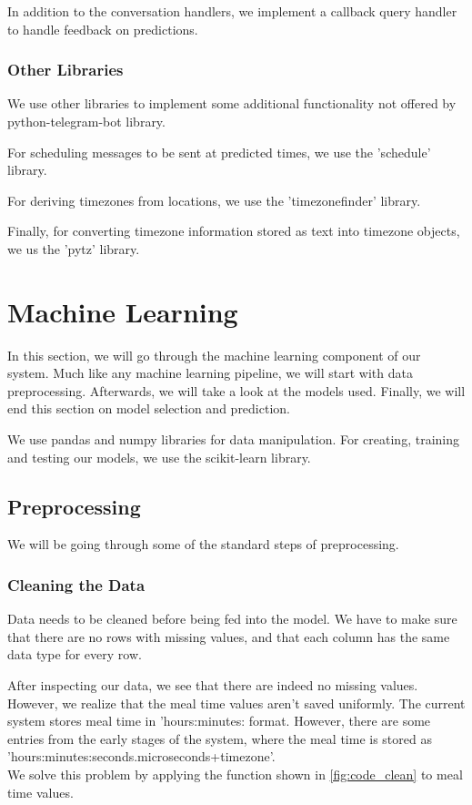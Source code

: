 In addition to the conversation handlers, we implement a callback query handler to handle feedback on predictions.

\subsubsection{Other Libraries}
We use other libraries to implement some additional functionality not offered by python-telegram-bot library.

For scheduling messages to be sent at predicted times, we use the 'schedule' library.

For deriving timezones from locations, we use the 'timezonefinder' library.

Finally, for converting timezone information stored as text into timezone objects, we us the 'pytz' library.

\section{Machine Learning}
In this section, we will go through the machine learning component of our system.
Much like any machine learning pipeline, we will start with data preprocessing.
Afterwards, we will take a look at the models used.
Finally, we will end this section on model selection and prediction.

We use pandas \parencite{pandas} and numpy \parencite{numpy} libraries for data manipulation.
For creating, training and testing our models, we use the scikit-learn \parencite{scikit-learn} library.
\subsection{Preprocessing}
We will be going through some of the standard steps of preprocessing.
\subsubsection{Cleaning the Data}
Data needs to be cleaned before being fed into the model.
We have to make sure that there are no rows with missing values,
and that each column has the same data type for every row.

After inspecting our data, we see that there are indeed no missing values.
However, we realize that the meal time values aren't saved uniformly.
The current system stores meal time in 'hours:minutes: format.
However, there are some entries from the early stages of the system, 
where the meal time is stored as\\
'hours:minutes:seconds.microseconds+timezone'.\\
We solve this problem by applying the function shown in \autoref{fig:code_clean} to meal time values.

